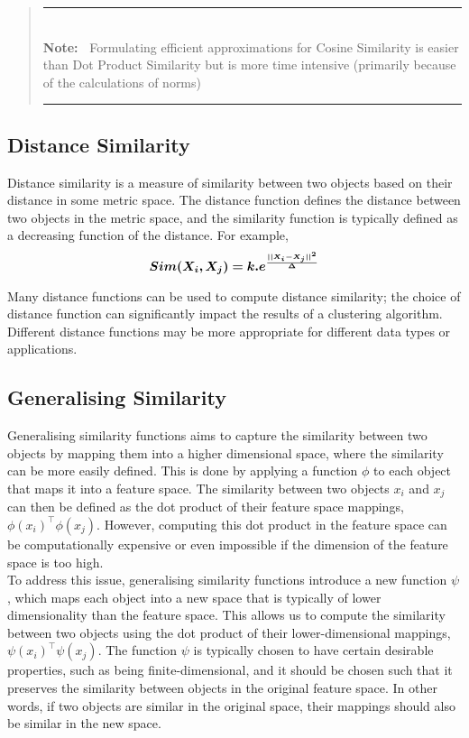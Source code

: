 \documentclass[12pt]{article}
\newlength{\Lnote}
\newcommand{\notte}[1]
     {\addtolength{\leftmargini}{0em}
        \settowidth{\Lnote}{\textbf{Note:~}}
        \begin{quote}
            \rule{\dimexpr\textwidth-2\leftmargini}{1pt}\\
                        \mbox{}\hspace{-\Lnote}\textbf{Note:~}%
                                            #1\\[-0.5ex] 
            \rule{\dimexpr\textwidth-2\leftmargini}{1pt}
        \end{quote}
        \addtolength{\leftmargini}{-0em}}
\begin{document}
\notte{Formulating efficient approximations for Cosine Similarity is easier than Dot Product Similarity but is more time intensive (primarily because of the calculations of norms)}

\subsection{Distance Similarity}
\noindent Distance similarity is a measure of similarity between two objects based on their distance in some metric space. The distance function defines the distance between two objects in the metric space, and the similarity function is typically defined as a decreasing function of the distance. For example,
\begin{equation}
    \boldsymbol{Sim(X_i,X_j) =k.e^\frac{||X_i-X_j||^2}{\Delta}} \notag
\end{equation}


\noindent Many distance functions can be used to compute distance similarity; the choice of distance function can significantly impact the results of a clustering algorithm. Different distance functions may be more appropriate for different data types or applications.

\subsection{Generalising Similarity}
Generalising similarity functions aims to capture the similarity between two objects by mapping them into a higher dimensional space, where the similarity can be more easily defined. This is done by applying a function $\phi$ to each object that maps it into a feature space. The similarity between two objects $x_i$ and $x_j$ can then be defined as the dot product of their feature space mappings, $\phi(x_i)^{\top} \phi(x_j)$. However, computing this dot product in the feature space can be computationally expensive or even impossible if the dimension of the feature space is too high.\\

To address this issue, generalising similarity functions introduce a new function $\psi$, which maps each object into a new space that is typically of lower dimensionality than the feature space. This allows us to compute the similarity between two objects using the dot product of their lower-dimensional mappings, $\psi(x_i)^{\top} \psi(x_j)$. The function $\psi$ is typically chosen to have certain desirable properties, such as being finite-dimensional, and it should be chosen such that it preserves the similarity between objects in the original feature space. In other words, if two objects are similar in the original space, their mappings should also be similar in the new space.\\
\end{document}
